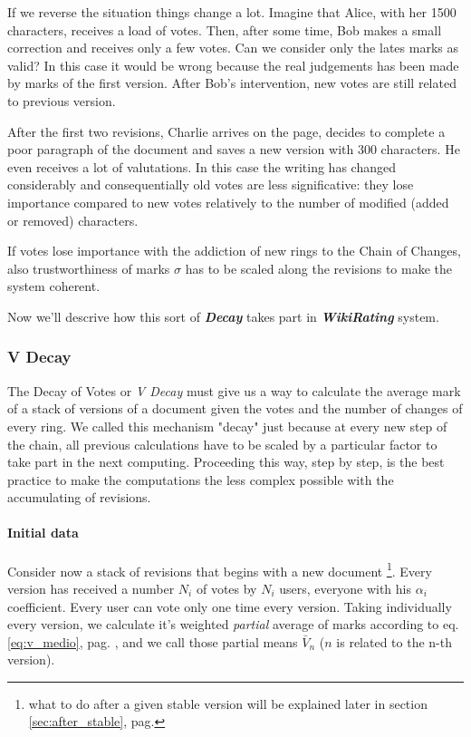 \documentclass[a4paper,11pt]{article}
\newcommand{\wir}{\textbf{\textit{WikiRating }}}
\newcommand{\sg}{$\sigma$ }
\newcommand{\pb}[1]{$\bar{V}_#1$ }
\begin{document}
If we reverse the situation things change a lot. Imagine that Alice, with her 1500 characters, receives a load of votes. Then, after some time, Bob makes a small correction and receives only a few votes. Can we consider only the lates marks as valid? In this case 
it would be wrong because the real judgements has been made by marks of the first 
version. After Bob's intervention, new votes are still related to previous version.

After the first two revisions, Charlie arrives on the page, decides to complete a poor 
paragraph of the document and saves a new version with 300 characters. He even receives a lot of valutations. In this case the writing has changed considerably and consequentially 
old votes are less significative: they lose importance compared to new votes relatively to the number of modified (added or removed) characters.

If votes lose importance with the addiction of new rings to the Chain of Changes, also trustworthiness of marks \sg has to be scaled along the revisions to make the system coherent. 

Now we'll descrive how this sort of \textit{\textbf{Decay}} takes part in \wir system.

\subsubsection{V Decay} \label{sec:v_decay}
The Decay of Votes or \emph{V Decay} must give us a way to calculate the average mark of a 
stack of versions of a document given the votes and the number of changes of every ring.
We called this mechanism "decay" just because at every new step of the chain, all previous 
calculations have to be scaled by a particular factor to take part in the next computing. 
Proceeding this way, step by step, is the best practice to make the computations the less 
complex possible with the accumulating of revisions.

\paragraph{Initial data} Consider now a stack of revisions that begins with a new document \footnote{what to do after a given stable version will be explained later in section \ref{sec:after_stable}, pag. \pageref{sec:after_stable}}. 
Every version has received a number $N_i$ of votes by $N_i$ users, everyone with his $
\alpha_i$ coefficient. Every user can vote only one time every version. Taking individually every version, we calculate it's weighted 
\emph{partial} average of marks according to eq. \ref{eq:v_medio}, pag. 
\pageref{eq:v_medio}, and we call those partial means \pb{n} ($n$ is related to the n-th version).\\
\end{document}
